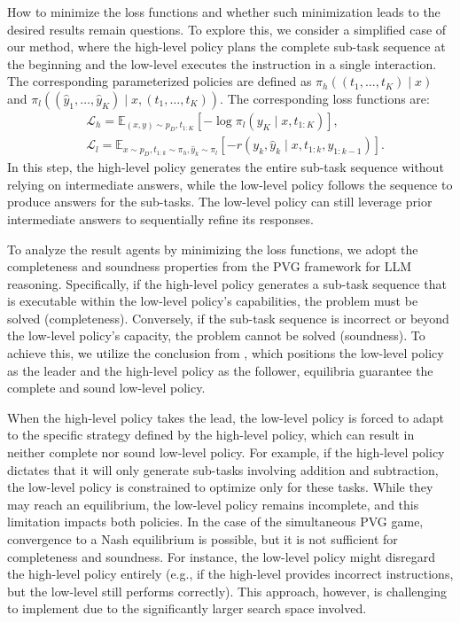 How to minimize the loss functions and whether such minimization leads to the desired results remain questions. To explore this, we consider a simplified case of our method, where the high-level policy plans the complete sub-task sequence at the beginning and the low-level executes the instruction in a single interaction. The corresponding parameterized policies are defined as $\pi_h((t_1, \dots, t_K) \mid x)$ and $\pi_l((\hat{y}_1, \dots, \hat{y}_K)\mid x, (t_1, \dots, t_K))$.
The corresponding loss functions are:
\begin{align} \label{eq:single_loss}
    & \mathcal{L}_h = \mathbb{E}_{(x, y)\sim p_D, t_{1:K}}\left[ -\log \pi_l(y_K \mid x, t_{1:K}) \right], \\
    & \mathcal{L}_l = \mathbb{E}_{x\sim p_D, t_{1:k}\sim \pi_h, \hat{y}_k \sim \pi_l} \left[ -r(y_k, \hat{y}_k \mid x, t_{1:k}, y_{1:k-1}) \right].
\end{align}
In this step, the high-level policy generates the entire sub-task sequence without relying on intermediate answers, while the low-level policy follows the sequence to produce answers for the sub-tasks. The low-level policy can still leverage prior intermediate answers to sequentially refine its responses.

To analyze the result agents by minimizing the loss functions, we adopt the completeness and soundness properties from the PVG framework for LLM reasoning. Specifically, if the high-level policy generates a sub-task sequence that is executable within the low-level policy’s capabilities, the problem must be solved (completeness). Conversely, if the sub-task sequence is incorrect or beyond the low-level policy’s capacity, the problem cannot be solved (soundness). To achieve this, we utilize the conclusion from \citet{DBLP:journals/corr/abs-2108-12099}, which positions the low-level policy as the leader and the high-level policy as the follower, equilibria guarantee the complete and sound low-level policy. 

When the high-level policy takes the lead, the low-level policy is forced to adapt to the specific strategy defined by the high-level policy, which can result in neither complete nor sound low-level policy. For example, if the high-level policy dictates that it will only generate sub-tasks involving addition and subtraction, the low-level policy is constrained to optimize only for these tasks. While they may reach an equilibrium, the low-level policy remains incomplete, and this limitation impacts both policies. In the case of the simultaneous PVG game, convergence to a Nash equilibrium is possible, but it is not sufficient for completeness and soundness. For instance, the low-level policy might disregard the high-level policy entirely (e.g., if the high-level provides incorrect instructions, but the low-level still performs correctly). This approach, however, is challenging to implement due to the significantly larger search space involved.

